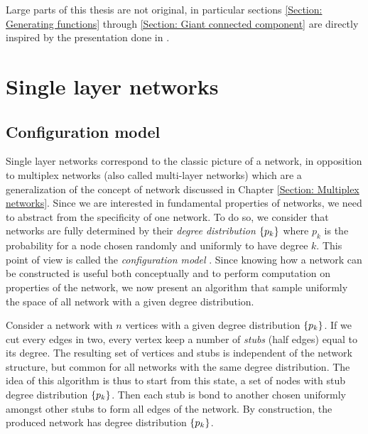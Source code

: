 \documentclass[
11pt, %
english, %
singlespacing, %
nolistspacing, %
liststotoc, %
headsepline, %
]{MastersDoctoralThesis} %
\begin{document}
Large parts of this thesis are not original, in particular sections \ref{Section: Generating functions} through \ref{Section: Giant connected component} are directly inspired by the presentation done in \cite{newman2010networks}.


\chapter{Single layer networks}
\label{Section: Single layer networks}

\section{Configuration model}
\label{Section: Configuration model}

Single layer networks correspond to the classic picture of a network, in opposition to multiplex networks (also called multi-layer networks) which are a generalization of the concept of network discussed in Chapter \ref{Section: Multiplex networks}. Since we are interested in fundamental properties of networks, we need to abstract from the specificity of one network. To do so, we consider that networks are fully determined by their \emph{degree distribution} $\{p_k\}$ where $p_k$ is the probability for a node chosen randomly and uniformly to have degree $k$. This point of view is called the \emph{configuration model} \missingref. Since knowing how a network can be constructed is useful both conceptually and to perform computation on properties of the network, we now present an algorithm that sample uniformly the space of all network with a given degree distribution.

Consider a network with $n$ vertices with a given degree distribution $\{p_k\}$. If we cut every edges in two, every vertex keep a number of \emph{stubs} (half edges) equal to its degree. The resulting set of vertices and stubs is independent of the network structure, but common for all networks with the same degree distribution. The idea of this algorithm is thus to start from this state, a set of nodes with stub degree distribution $\{p_k\}$. Then each stub is bond to another chosen uniformly amongst other stubs to form all edges of the network. By construction, the produced network has degree distribution $\{p_k\}$.

\end{document}

